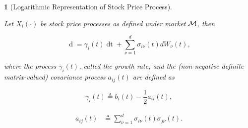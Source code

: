 \documentclass[british]{amsart} \usepackage{lmodern}
\numberwithin{equation}{section} \numberwithin{figure}{section}
\theoremstyle{plain} \newtheorem{thm}{\protect\theoremname}[section]
\theoremstyle{definition} \newtheorem{defn}[thm]{\protect\definitionname}
\theoremstyle{plain} \newtheorem{assumption}[thm]{\protect\assumptionname}
\theoremstyle{plain} \newtheorem{lem}[thm]{\protect\lemmaname}
\theoremstyle{plain} \newtheorem{prop}[thm]{\protect\propositionname}
\theoremstyle{remark} \newtheorem{rem}[thm]{\protect\remarkname}
\theoremstyle{plain} \newtheorem{cor}[thm]{\protect\corollaryname}
\renewcommand{\d}[1]{\mathop{\mathrm{d}{#1}}}
\newcommand{\defeq}{\mathop{\triangleq}} \newcommand{\almostsurely}{\text{a.s.}}
\begin{document}
\begin{prop} [Logarithmic Representation of Stock Price Process]
  \label{thm:logarithmicrepresentation}

  Let $X_{i}(\cdot)$ be stock price processes as defined under market $\mathcal{M}$,
  then

  \begin{equation}
    \label{eq:dlogX}
        \d{\log{X_{i}(t)}} =
          \gamma_{i}(t) \d{t} +
          \sum_{\nu=1}^{d} \sigma_{i\nu}(t) dW_{\nu}(t),
  \end{equation}

  where the process $\gamma_{i}(t)$, called the \textit{growth rate}, and the
  (non-negative definite matrix-valued) \textit{covariance process} $a_{ij}(t)$
  are defined as

  \begin{equation}
    \label{eq:gamma}
    \gamma_{i}(t)\defeq b_{i}(t)-\frac{1}{2}a_{ii}(t),
  \end{equation}

  \begin{gather}
    \label{eq:covarianceprocess}
    \begin{split}
      a_{ij}(t)
        & \defeq \sum_{\nu=1}^{d}\sigma_{i\nu}(t)\sigma_{j\nu}(t).
    \end{split}
  \end{gather}

\end{prop}
\end{document}
